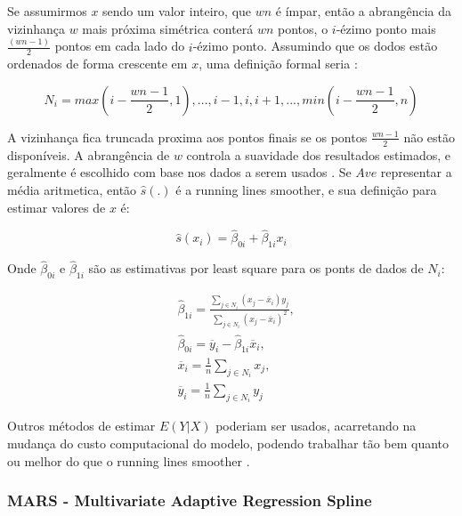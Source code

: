 \documentclass[
	12pt,				%
	openright,			%
	oneside,			%
	a4paper,			%
	english,			%
	brazil				%
	]{abntex2}
\begin{document}
Se assumirmos $x$ sendo um valor inteiro, que $wn$ é ímpar, então a abrangência da vizinhança $w$ mais próxima simétrica conterá
$wn$ pontos, o $i$-ézimo ponto mais $\frac{(wn - 1)}{2}$ pontos em cada lado do $i$-ézimo ponto. Assumindo que os dodos
estão ordenados de forma crescente em $x$, uma definição formal seria \cite{GAM}:

\begin{equation}
	\label{eq_vizinhanaça}
	N_i = {max(i-\frac{wn-1}{2},1),...,i-1,i,i+1,...,min(i-\frac{wn-1}{2},n)}
\end{equation}

A vizinhança fica truncada proxima aos pontos finais se os pontos $\frac{wn-1}{2}$ não estão disponíveis. A abrangência de $w$
controla a suavidade dos resultados estimados, e geralmente é escolhido com base nos dados a serem usados \cite{GAM}. Se
$Ave$ representar a média aritmetica, então $\hat{s}(.)$ é a running lines smoother, e sua definição para estimar valores
de $x$ é:

\begin{equation}
	\label{running_lines_smoother}
	\hat{s}(x_i) = \hat{\beta}_{0i} + \hat{\beta}_{1i}x_i
\end{equation}

Onde $\hat{\beta}_{0i}$ e $\hat{\beta}_{1i}$ são as estimativas por least square para os ponts de dados de $N_i$:

\begin{equation}
	\label{least_square_betas}
	\begin{split}
		&\hat{\beta}_{1i} = \frac{\sum_{j \in N_i}(x_j - \overline{x}_i)y_j}{\sum_{j \in N_i}(x_j - \overline{x}_i)^2}, \\
		&\hat{\beta}_{0i} = \overline{y}_i - \hat{\beta}_{1i}\overline{x}_i, \\
		&\overline{x}_i = \frac{1}{n}\sum_{j \in N_i}x_j, \\
		&\overline{y}_i = \frac{1}{n}\sum_{j \in N_i}y_j
	\end{split}
\end{equation}

Outros métodos de estimar $E(Y|X)$ poderiam ser usados, acarretando na mudança do custo computacional do modelo, podendo
trabalhar tão bem quanto ou melhor do que o running lines smoother \cite{GAM}.

\subsubsection{MARS - Multivariate Adaptive Regression Spline}
\end{document}
